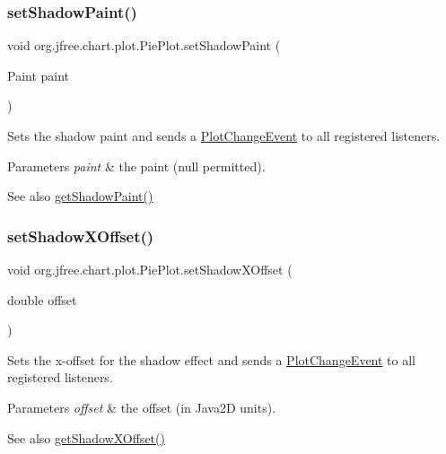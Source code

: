 \subsubsection{\texorpdfstring{set\+Shadow\+Paint()}{setShadowPaint()}}
{\footnotesize\ttfamily void org.\+jfree.\+chart.\+plot.\+Pie\+Plot.\+set\+Shadow\+Paint (\begin{DoxyParamCaption}\item[{Paint}]{paint }\end{DoxyParamCaption})}

Sets the shadow paint and sends a \mbox{\hyperlink{}{Plot\+Change\+Event}} to all registered listeners.


\begin{DoxyParams}{Parameters}
{\em paint} & the paint ({\ttfamily null} permitted).\\
\hline
\end{DoxyParams}
\begin{DoxySeeAlso}{See also}
\mbox{\hyperlink{classorg_1_1jfree_1_1chart_1_1plot_1_1_pie_plot_a0f084cdc0a89fbfaf5a2fa840c4bac03}{get\+Shadow\+Paint()}} 
\end{DoxySeeAlso}
\mbox{\label{classorg_1_1jfree_1_1chart_1_1plot_1_1_pie_plot_a98d8b7faad998b6a5cbc262e4fcb9427}} 
\subsubsection{\texorpdfstring{set\+Shadow\+X\+Offset()}{setShadowXOffset()}}
{\footnotesize\ttfamily void org.\+jfree.\+chart.\+plot.\+Pie\+Plot.\+set\+Shadow\+X\+Offset (\begin{DoxyParamCaption}\item[{double}]{offset }\end{DoxyParamCaption})}

Sets the x-\/offset for the shadow effect and sends a \mbox{\hyperlink{}{Plot\+Change\+Event}} to all registered listeners.


\begin{DoxyParams}{Parameters}
{\em offset} & the offset (in Java2D units).\\
\hline
\end{DoxyParams}
\begin{DoxySeeAlso}{See also}
\mbox{\hyperlink{classorg_1_1jfree_1_1chart_1_1plot_1_1_pie_plot_a1c2adbcc6f258fa7ff132d8dfe82216c}{get\+Shadow\+X\+Offset()}} 
\end{DoxySeeAlso}
\mbox{\label{classorg_1_1jfree_1_1chart_1_1plot_1_1_pie_plot_a9822ca063910bf91ac9f7c73e70428ee}} 
